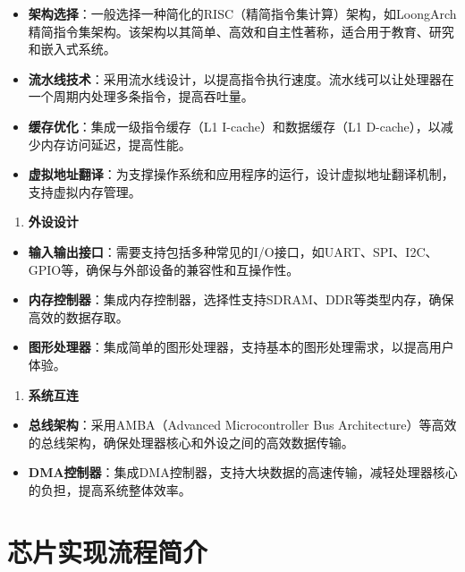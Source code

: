 \begin{itemize}
\tightlist
\item
  \textbf{架构选择}：一般选择一种简化的RISC（精简指令集计算）架构，如LoongArch精简指令集架构。该架构以其简单、高效和自主性著称，适合用于教育、研究和嵌入式系统。
\item
  \textbf{流水线技术}：采用流水线设计，以提高指令执行速度。流水线可以让处理器在一个周期内处理多条指令，提高吞吐量。
\item
  \textbf{缓存优化}：集成一级指令缓存（L1 I-cache）和数据缓存（L1 D-cache），以减少内存访问延迟，提高性能。
\item
  \textbf{虚拟地址翻译}：为支撑操作系统和应用程序的运行，设计虚拟地址翻译机制，支持虚拟内存管理。
\end{itemize}

\begin{enumerate}
\def\labelenumi{\arabic{enumi}.}
\setcounter{enumi}{1}
\tightlist
\item
  \textbf{外设设计}
\end{enumerate}

\begin{itemize}
\tightlist
\item
  \textbf{输入输出接口}：需要支持包括多种常见的I/O接口，如UART、SPI、I2C、GPIO等，确保与外部设备的兼容性和互操作性。
\item
  \textbf{内存控制器}：集成内存控制器，选择性支持SDRAM、DDR等类型内存，确保高效的数据存取。
\item
  \textbf{图形处理器}：集成简单的图形处理器，支持基本的图形处理需求，以提高用户体验。
\end{itemize}

\begin{enumerate}
\def\labelenumi{\arabic{enumi}.}
\setcounter{enumi}{2}
\tightlist
\item
  \textbf{系统互连}
\end{enumerate}

\begin{itemize}
\tightlist
\item
  \textbf{总线架构}：采用AMBA（Advanced Microcontroller Bus Architecture）等高效的总线架构，确保处理器核心和外设之间的高效数据传输。
\item
  \textbf{DMA控制器}：集成DMA控制器，支持大块数据的高速传输，减轻处理器核心的负担，提高系统整体效率。
\end{itemize}

\section{芯片实现流程简介}\label{sec:01-overview-005}

